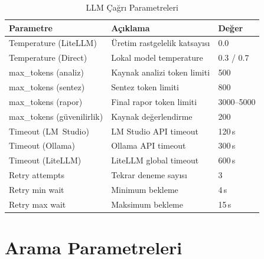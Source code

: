 \begin{table}[H]
\centering
\caption{LLM \c{C}a\u{g}r{\i} Parametreleri}
\label{tab:llm_params}
\begin{tabularx}{\textwidth}{lXl}
\toprule
\color{chapterBlue}\textbf{Parametre} & \color{chapterBlue}\textbf{A\c{c}{\i}klama} & \color{chapterBlue}\textbf{De\u{g}er} \\
\midrule
Temperature (LiteLLM) & \"{U}retim rastgelelik katsay{\i}s{\i} & 0.0 \\
Temperature (Direct) & Lokal model temperature & 0.3 / 0.7 \\
max\_tokens (analiz) & Kaynak analizi token limiti & 500 \\
max\_tokens (sentez) & Sentez token limiti & 800 \\
max\_tokens (rapor) & Final rapor token limiti & 3000--5000 \\
max\_tokens (g\"{u}venilirlik) & Kaynak de\u{g}erlendirme & 200 \\
Timeout (LM~Studio) & LM Studio API timeout & 120\,s \\
Timeout (Ollama) & Ollama API timeout & 300\,s \\
Timeout (LiteLLM) & LiteLLM global timeout & 600\,s \\
Retry attempts & Tekrar deneme say{\i}s{\i} & 3 \\
Retry min wait & Minimum bekleme & 4\,s \\
Retry max wait & Maksimum bekleme & 15\,s \\
\bottomrule
\end{tabularx}
\end{table}

\section{Arama Parametreleri}

